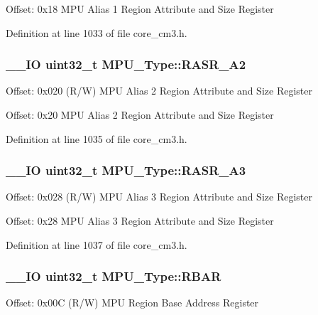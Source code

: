 Offset\-: 0x18 M\-P\-U Alias 1 Region Attribute and Size Register 

Definition at line 1033 of file core\-\_\-cm3.\-h.

\hypertarget{struct_m_p_u___type_a0aac7727a6225c6aa00627c36d51d014}{
\subsubsection[{R\-A\-S\-R\-\_\-\-A2}]{\setlength{\rightskip}{0pt plus 5cm}\-\_\-\-\_\-\-I\-O {\bf uint32\-\_\-t} M\-P\-U\-\_\-\-Type\-::\-R\-A\-S\-R\-\_\-\-A2}}\label{struct_m_p_u___type_a0aac7727a6225c6aa00627c36d51d014}
Offset\-: 0x020 (R/\-W) M\-P\-U Alias 2 Region Attribute and Size Register

Offset\-: 0x20 M\-P\-U Alias 2 Region Attribute and Size Register 

Definition at line 1035 of file core\-\_\-cm3.\-h.

\hypertarget{struct_m_p_u___type_aced0b908173b9a4bae4f59452f0cdb0d}{
\subsubsection[{R\-A\-S\-R\-\_\-\-A3}]{\setlength{\rightskip}{0pt plus 5cm}\-\_\-\-\_\-\-I\-O {\bf uint32\-\_\-t} M\-P\-U\-\_\-\-Type\-::\-R\-A\-S\-R\-\_\-\-A3}}\label{struct_m_p_u___type_aced0b908173b9a4bae4f59452f0cdb0d}
Offset\-: 0x028 (R/\-W) M\-P\-U Alias 3 Region Attribute and Size Register

Offset\-: 0x28 M\-P\-U Alias 3 Region Attribute and Size Register 

Definition at line 1037 of file core\-\_\-cm3.\-h.

\hypertarget{struct_m_p_u___type_a3f2e2448a77aadacd9f394f6c4c708d9}{
\subsubsection[{R\-B\-A\-R}]{\setlength{\rightskip}{0pt plus 5cm}\-\_\-\-\_\-\-I\-O {\bf uint32\-\_\-t} M\-P\-U\-\_\-\-Type\-::\-R\-B\-A\-R}}\label{struct_m_p_u___type_a3f2e2448a77aadacd9f394f6c4c708d9}
Offset\-: 0x00\-C (R/\-W) M\-P\-U Region Base Address Register

